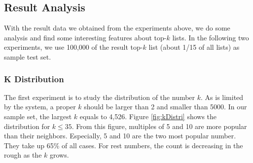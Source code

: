
%
%

\subsection{Result Analysis}
With the result data we obtained from the experiments above,
we do some analysis and find some interesting features about top-$k$ lists.
In the following two experiments,
we use 100,000 of the result top-$k$ list (about 1/15 of all lists)  as sample test set.

\subsubsection{K Distribution}
The first experiment is to study the distribution of the number $k$.
As is limited by the system, a proper $k$ should be larger than 2 and smaller than 5000.
In our sample set, the largest $k$ equals to 4,526.
Figure \ref{fig:kDistri} shows the distribution for $k\leq35$.
From this figure,
multiples of 5 and 10 are more popular than their neighbors.
Especially, 5 and 10 are the two most  popular number. They take up 65\% of all cases.
For rest numbers, the count is decreasing in the rough as the $k$ grows.

